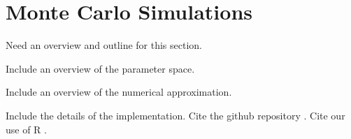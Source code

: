 

\section{Monte Carlo Simulations}

Need an overview and outline for this section.

Include an overview of the parameter space.

Include an overview of the numerical approximation.

Include the details of the implementation. Cite the github repository
\cite{deerActuaryRepo}.  Cite our use of R \cite{R}.

